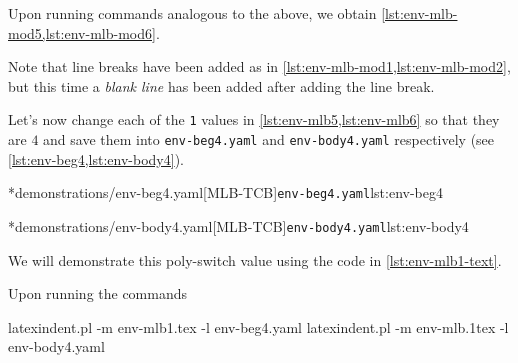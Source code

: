 		Upon running commands analogous to the above, we obtain
		\cref{lst:env-mlb-mod5,lst:env-mlb-mod6}.

		\begin{widepage}
			\begin{minipage}{.56\linewidth}
			\end{minipage}
			\hfill
			\begin{minipage}{.43\linewidth}
			\end{minipage}
		\end{widepage}

		Note that line breaks have been added as in \cref{lst:env-mlb-mod1,lst:env-mlb-mod2}, but
		this time a \emph{blank line} has been added after adding the line break.

		Let's now change%
		 each of the \texttt{1} values in
		\cref{lst:env-mlb5,lst:env-mlb6} so that they are $4$ and save them into
		\texttt{env-beg4.yaml} and \texttt{env-body4.yaml} respectively (see
		\cref{lst:env-beg4,lst:env-body4}).

		\begin{minipage}{.45\textwidth}
			\cmhlistingsfromfile[style=yaml-LST]*{demonstrations/env-beg4.yaml}[MLB-TCB]{\texttt{env-beg4.yaml}}{lst:env-beg4}
		\end{minipage}
		\hfill
		\begin{minipage}{.45\textwidth}
			\cmhlistingsfromfile[style=yaml-LST]*{demonstrations/env-body4.yaml}[MLB-TCB]{\texttt{env-body4.yaml}}{lst:env-body4}
		\end{minipage}

		We will demonstrate this poly-switch value using the code in \cref{lst:env-mlb1-text}.


		Upon running the commands
		\begin{commandshell}
latexindent.pl -m env-mlb1.tex -l env-beg4.yaml
latexindent.pl -m env-mlb.1tex -l env-body4.yaml
\end{commandshell}

